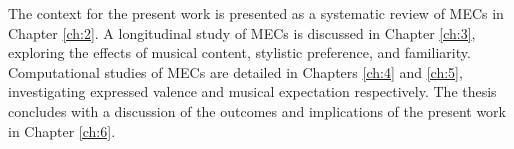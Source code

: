 The context for the present work is presented as a systematic review of MECs in Chapter \ref{ch:2}. A longitudinal study of MECs is discussed in Chapter \ref{ch:3}, exploring the effects of musical content, stylistic preference, and familiarity. Computational studies of MECs are detailed in Chapters \ref{ch:4} and \ref{ch:5}, investigating expressed valence and musical expectation respectively. The thesis concludes with a discussion of the outcomes and implications of the present work in Chapter \ref{ch:6}.
